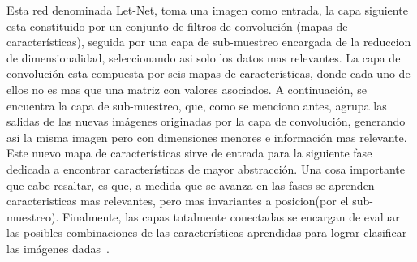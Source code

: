 Esta red denominada Let-Net, toma una imagen como entrada, la capa siguiente esta constituido por un conjunto de filtros de convolución (mapas de características), seguida por una capa de sub-muestreo encargada de la reduccion de dimensionalidad, seleccionando asi solo los datos mas relevantes. La capa de convolución esta compuesta por seis mapas de características, donde cada uno de ellos no es mas que una matriz con valores asociados. A continuación, se encuentra la capa de sub-muestreo, que, como se menciono antes, agrupa las salidas de las nuevas imágenes originadas por la capa de convolución, generando asi la misma imagen pero con dimensiones menores e información mas relevante. Este nuevo mapa de características sirve de entrada para la siguiente fase dedicada a encontrar características de mayor abstracción. Una cosa importante que cabe resaltar, es que, a medida que se avanza en las fases se aprenden caracteristicas mas relevantes, pero mas invariantes a posicion(por el sub-muestreo). Finalmente, las capas totalmente conectadas se encargan de evaluar las posibles combinaciones de las características aprendidas para lograr clasificar las imágenes dadas~\cite{16pusiol2014redes}.

